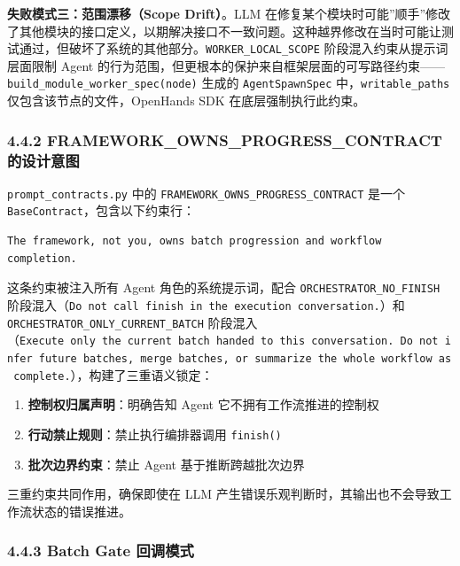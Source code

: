 \textbf{失败模式三：范围漂移（Scope Drift）}。LLM
在修复某个模块时可能''顺手''修改了其他模块的接口定义，以期解决接口不一致问题。这种越界修改在当时可能让测试通过，但破坏了系统的其他部分。\texttt{WORKER\_LOCAL\_SCOPE}
阶段混入约束从提示词层面限制 Agent
的行为范围，但更根本的保护来自框架层面的可写路径约束------\texttt{build\_module\_worker\_spec(node)}
生成的 \texttt{AgentSpawnSpec} 中，\texttt{writable\_paths}
仅包含该节点的文件，OpenHands SDK 在底层强制执行此约束。

\subsubsection{4.4.2 FRAMEWORK\_OWNS\_PROGRESS\_CONTRACT
的设计意图}\label{framework_owns_progress_contract-ux7684ux8bbeux8ba1ux610fux56fe}

\texttt{prompt\_contracts.py} 中的
\texttt{FRAMEWORK\_OWNS\_PROGRESS\_CONTRACT} 是一个
\texttt{BaseContract}，包含以下约束行：

\begin{verbatim}
The framework, not you, owns batch progression and workflow completion.
\end{verbatim}

这条约束被注入所有 Agent 角色的系统提示词，配合
\texttt{ORCHESTRATOR\_NO\_FINISH}
阶段混入（\texttt{Do\ not\ call\ finish\ in\ the\ execution\ conversation.}）和
\texttt{ORCHESTRATOR\_ONLY\_CURRENT\_BATCH}
阶段混入（\texttt{Execute\ only\ the\ current\ batch\ handed\ to\ this\ conversation.\ Do\ not\ infer\ future\ batches,\ merge\ batches,\ or\ summarize\ the\ whole\ workflow\ as\ complete.}），构建了三重语义锁定：

\begin{enumerate}
\def\labelenumi{\arabic{enumi}.}
\tightlist
\item
  \textbf{控制权归属声明}：明确告知 Agent 它不拥有工作流推进的控制权
\item
  \textbf{行动禁止规则}：禁止执行编排器调用 \texttt{finish()}
\item
  \textbf{批次边界约束}：禁止 Agent 基于推断跨越批次边界
\end{enumerate}

三重约束共同作用，确保即使在 LLM
产生错误乐观判断时，其输出也不会导致工作流状态的错误推进。

\subsubsection{4.4.3 Batch Gate
回调模式}\label{batch-gate-ux56deux8c03ux6a21ux5f0f}

